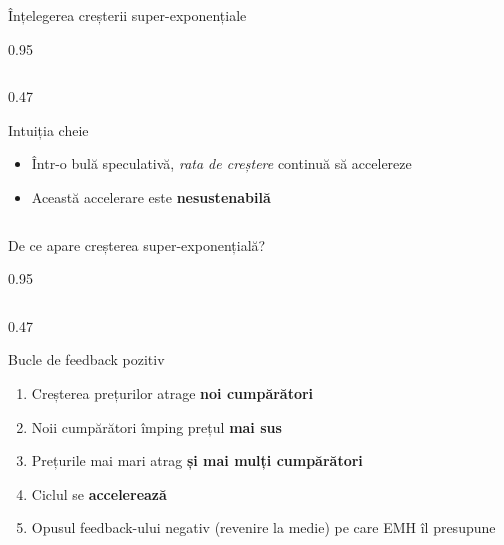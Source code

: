 \documentclass[9pt, aspectratio=169, t]{beamer}
\begin{document}
\begin{frame}{Înțelegerea creșterii super-exponențiale}
\begin{cminipage}{0.95\textwidth}
{\begin{columns}[T]
\begin{column}{0.47\textwidth}
            \begin{block}{Intuiția cheie}
                \begin{itemize}\setlength{\itemsep}{0pt}
                    \item Într-o bulă speculativă, \textit{rata de creștere} continuă să accelereze
                    \item Această accelerare este \textbf{nesustenabilă}
                \end{itemize}
            \end{block}
        \end{column}
    \end{columns}
    }
    \end{cminipage}
\end{frame}

\begin{frame}{De ce apare creșterea super-exponențială?}
    \begin{cminipage}{0.95\textwidth}
    {\footnotesize
    \begin{columns}[T]
        \begin{column}{0.47\textwidth}
            \begin{block}{Bucle de feedback pozitiv}
                \begin{enumerate}\setlength{\itemsep}{1pt}
                    \item Creșterea prețurilor atrage \textbf{noi cumpărători}
                    \item Noii cumpărători împing prețul \textbf{mai sus}
                    \item Prețurile mai mari atrag \textbf{și mai mulți cumpărători}
                    \item Ciclul se \textbf{accelerează}
                    \item Opusul feedback-ului negativ (revenire la medie) pe care EMH îl presupune
                \end{enumerate}
            \end{block}


\end{column}
\end{columns}}
\end{cminipage}
\end{frame}
\end{document}
